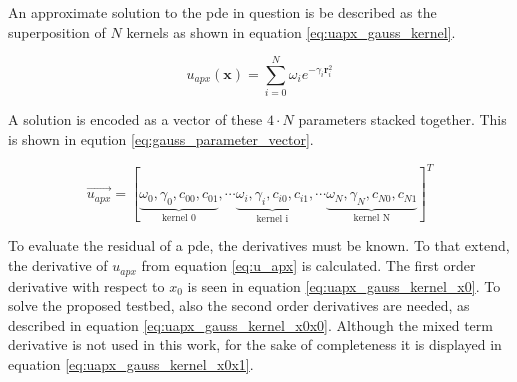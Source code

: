 \documentclass[./\jobname.tex]{subfiles}
\begin{document}
\begin{figure}[H]
	\centering
	\noindent{}
	\label{fig:gauss_kernel_3d_plot}
\end{figure}

An approximate solution to the \gls{pde} in question is be described as the superposition of $N$ kernels as shown in equation \ref{eq:uapx_gauss_kernel}. 

\begin{equation}
\label{eq:uapx_gauss_kernel}
u_{apx}(\mathbf{x}) = \sum_{i=0}^{N} \omega_i e^{-\gamma_i \mathbf{r}_i^2}
\end{equation}

A solution is encoded as a vector of these $4\cdot N$ parameters stacked together. This is shown in eqution \ref{eq:gauss_parameter_vector}. 

\begin{equation}
\label{eq:gauss_parameter_vector}
\vec{u_{apx}} = \left[\underbrace{\omega_0, \gamma_0, c_{00}, c_{01}}_{\text{kernel 0}}, \cdots \underbrace{\omega_i, \gamma_i, c_{i0}, c_{i1}}_{\text{kernel i}}, \cdots \underbrace{\omega_N, \gamma_N, c_{N0}, c_{N1}}_{\text{kernel N}} \right]^T
\end{equation}

To evaluate the residual of a \gls{pde}, the derivatives must be known. To that extend, the derivative of $u_{apx}$ from equation \ref{eq:u_apx} is calculated. The first order derivative with respect to $x_0$ is seen in equation \ref{eq:uapx_gauss_kernel_x0}. To solve the proposed testbed, also the second order derivatives are needed, as described in equation \ref{eq:uapx_gauss_kernel_x0x0}. Although the mixed term derivative is not used in this work, for the sake of completeness it is displayed in equation \ref{eq:uapx_gauss_kernel_x0x1}.  
\end{document}
